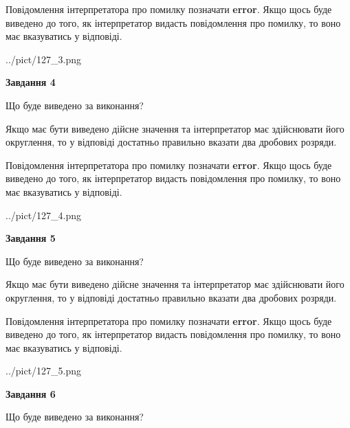 \documentclass[12pt, ukrainian]{article}
\begin{document}
{\begin {Large}
Повідомлення інтерпретатора про помилку позначати \textbf{error}.
Якщо щось буде виведено до того, як інтерпретатор видасть повідомлення про помилку, 
то воно має вказуватись у відповіді. \par

\begin{center}
	{../pict/127_3.png}
\end{center}
\newpage

{\begin {center}\textbf{Завдання 4}\end {center}}\par
Що буде виведено за виконання? \par

Якщо має бути виведено дійсне значення та інтерпретатор має здійснювати його округлення, 
то у відповіді достатньо правильно вказати два дробових розряди.

Повідомлення інтерпретатора про помилку позначати \textbf{error}.
Якщо щось буде виведено до того, як інтерпретатор видасть повідомлення про помилку, 
то воно має вказуватись у відповіді. \par

\begin{center}
	{../pict/127_4.png}
\end{center}
\newpage

{\begin {center}\textbf{Завдання 5}\end {center}}\par
Що буде виведено за виконання? \par

Якщо має бути виведено дійсне значення та інтерпретатор має здійснювати його округлення, 
то у відповіді достатньо правильно вказати два дробових розряди.

Повідомлення інтерпретатора про помилку позначати \textbf{error}.
Якщо щось буде виведено до того, як інтерпретатор видасть повідомлення про помилку, 
то воно має вказуватись у відповіді. \par

\begin{center}
	{../pict/127_5.png}
\end{center}
\newpage

{\begin {center}\textbf{Завдання 6}\end {center}}\par
Що буде виведено за виконання? \par


\end{Large}}
\end{document}
